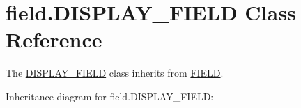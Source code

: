 \hypertarget{classfield_1_1DISPLAY__FIELD}{}\section{field.\+D\+I\+S\+P\+L\+A\+Y\+\_\+\+F\+I\+E\+LD Class Reference}
\label{classfield_1_1DISPLAY__FIELD}


The \hyperlink{classfield_1_1DISPLAY__FIELD}{D\+I\+S\+P\+L\+A\+Y\+\_\+\+F\+I\+E\+LD} class inherits from \hyperlink{classfield_1_1FIELD}{F\+I\+E\+LD}.  




Inheritance diagram for field.\+D\+I\+S\+P\+L\+A\+Y\+\_\+\+F\+I\+E\+LD\+:
